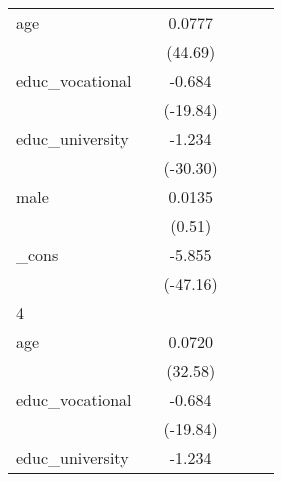 {\begin{tabular}{l*{5}{c}}
age         &                     &      0.0777\sym{***}&                     &                     &                     \\
            &                     &     (44.69)         &                     &                     &                     \\
[1em]
educ\_vocational&                     &      -0.684\sym{***}&                     &                     &                     \\
            &                     &    (-19.84)         &                     &                     &                     \\
[1em]
educ\_university&                     &      -1.234\sym{***}&                     &                     &                     \\
            &                     &    (-30.30)         &                     &                     &                     \\
[1em]
male        &                     &      0.0135         &                     &                     &                     \\
            &                     &      (0.51)         &                     &                     &                     \\
[1em]
\_cons      &                     &      -5.855\sym{***}&                     &                     &                     \\
            &                     &    (-47.16)         &                     &                     &                     \\
\hline
4           &                     &                     &                     &                     &                     \\
age         &                     &      0.0720\sym{***}&                     &                     &                     \\
            &                     &     (32.58)         &                     &                     &                     \\
[1em]
educ\_vocational&                     &      -0.684\sym{***}&                     &                     &                     \\
            &                     &    (-19.84)         &                     &                     &                     \\
[1em]
educ\_university&                     &      -1.234\sym{***}&                     &                     &                     \\

\end{tabular}}
